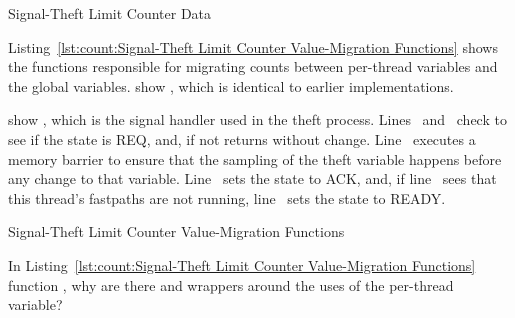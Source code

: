 \begin{listing}[tbp]

\caption{Signal-Theft Limit Counter Data}
\label{lst:count:Signal-Theft Limit Counter Data}
\end{listing}

\begin{lineref}
Listing~\ref{lst:count:Signal-Theft Limit Counter Value-Migration Functions}
shows the functions responsible for migrating counts between per-thread
variables and the global variables.
 show ,
which is identical to earlier
implementations.
\end{lineref}
\begin{lineref}
 show ,
which is the signal
handler used in the theft process.
Lines~ and~ check to see if
the  state is REQ, and, if not
returns without change.
Line~ executes a memory barrier to ensure that the sampling of the
theft variable happens before any change to that variable.
Line~ sets the  state to ACK, and, if
line~ sees that
this thread's fastpaths are not running, line~ sets the 
state to READY.
\end{lineref}

\begin{listing}[tbp]

\caption{Signal-Theft Limit Counter Value-Migration Functions}
\label{lst:count:Signal-Theft Limit Counter Value-Migration Functions}
\end{listing}

\QuickQuiz{}
	In Listing~\ref{lst:count:Signal-Theft Limit Counter Value-Migration Functions}
	function , why are there
	 and  wrappers around
	the uses of the
	 per-thread variable?
 \QuickQuizEnd

